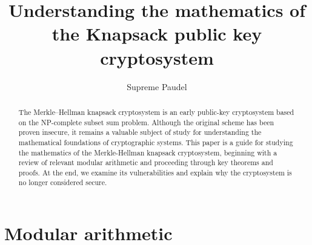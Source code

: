 \documentclass[manuscript,screen,review,nonacm]{acmart}
\begin{document}
\title{Understanding the mathematics of the Knapsack public key cryptosystem}

\author{Supreme Paudel}


\begin{abstract}
The Merkle–Hellman knapsack cryptosystem is an early public-key cryptosystem based on the NP-complete subset sum problem. Although the original scheme has been proven insecure, it remains a valuable subject of study for understanding the mathematical foundations of cryptographic systems. This paper is a guide for studying the mathematics of the Merkle-Hellman knapsack cryptosystem, beginning with a review of relevant modular arithmetic and proceeding through key theorems and proofs. At the end, we examine its vulnerabilities and explain why the cryptosystem is no longer considered secure.
\end{abstract}


\maketitle

\section{Modular arithmetic}
\end{document}
